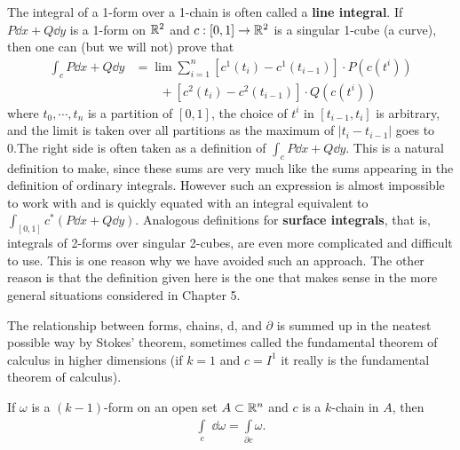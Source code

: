 The integral of a 1-form over a 1-chain is often called a \textbf{line integral}. 
If $P\dd x + Q\dd y$ is a 1-form on $\mathbb{R}^2$ and $c:[0,1]\to\mathbb{R}^2$
is a singular 1-cube (a curve), then one can (but we will not) prove that
\begin{align*}
    \int_c P\dd x+Q\dd y
    & = \lim\sum_{i=1}^n\left[c^1(t_i)-c^1(t_{i-1})\right]\cdot P(c(t^i)) \\
    & \qquad + \left[c^2(t_i)-c^2(t_{i-1})\right]\cdot Q(c(t^i))
\end{align*}
where $t_0,\cdots,t_n$ is a partition of $[0,1]$, the choice of $t^i$ in
$[t_{i-1},t_i]$ is arbitrary, and the limit is taken over all partitions
as the maximum of $|t_i-t_{i-1}|$ goes to 0.The right side is often taken as a definition 
of $\int_c P \dd x + Q \dd y$. This is a natural definition to make, since these sums are 
very much like the sums appearing in the definition of ordinary integrals. However such an 
expression is almost impossible to work with and is quickly equated with an integral equivalent 
to $\int_{[0,1]}c^*(P \dd x+ Q \dd y)$. Analogous definitions for \textbf{surface integrals}, that
is, integrals of 2-forms over singular 2-cubes, are even more complicated and difficult to use.
This is one reason why we have avoided such an approach. The other reason is that the definition 
given here is the one that makes sense in the more general situations considered in Chapter 5.

The relationship between forms, chains, d, and $\partial$ is summed up in the neatest possible way 
by Stokes' theorem, sometimes called the fundamental theorem of calculus in higher dimensions 
(if $k = 1$ and $c = I^1$ it really is the fundamental theorem of calculus).

\begin{theorem}
    If $\omega$ is a $(k-1 )$-form on an open set $A\subset\mathbb{R}^n$ and $c$ is a $k$-chain in $A$, then
    \begin{align*}
      \int\limits_c\;\dd\omega=\int\limits_{\partial c}\omega.
    \end{align*}
\end{theorem}

